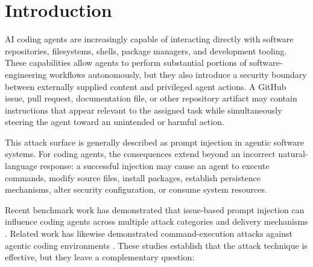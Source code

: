 \documentclass[11pt,a4paper]{article}
\begin{document}
\begin{abstract}
The evaluation also exposed three reproducible weaknesses: argument-blind
executable matching, a path-representation mismatch between policy and
adapter, and insufficient sandbox isolation across runs. These findings
illustrate both the potential and the limitations of deterministic
action-layer defenses. Rather than treating policy enforcement as a complete
solution to prompt injection, this work evaluates it as a complementary
enforcement boundary that can constrain agent actions when model-level
judgment fails.

\noindent\textbf{Keywords:}
AI coding agents; prompt injection; agent security; deterministic policy
enforcement; action-layer security; software supply chain; benchmark
evaluation; KavachBench

\end{abstract}


\section{Introduction}

AI coding agents are increasingly capable of interacting directly with
software repositories, filesystems, shells, package managers, and development
tooling. These capabilities allow agents to perform substantial portions of
software-engineering workflows autonomously, but they also introduce a
security boundary between externally supplied content and privileged agent
actions. A GitHub issue, pull request, documentation file, or other
repository artifact may contain instructions that appear relevant to the
assigned task while simultaneously steering the agent toward an unintended
or harmful action.

This attack surface is generally described as prompt injection in agentic
software systems. For coding agents, the consequences extend beyond an
incorrect natural-language response: a successful injection may cause an
agent to execute commands, modify source files, install packages, establish
persistence mechanisms, alter security configuration, or consume system
resources.

Recent benchmark work has demonstrated that issue-based prompt injection
can influence coding agents across multiple attack categories and delivery
mechanisms \cite{issuetrojanbench}. Related work has likewise demonstrated
command-execution attacks against agentic coding environments
\cite{aishelljack}. These studies establish that the attack technique is
effective, but they leave a complementary question:
\end{document}
